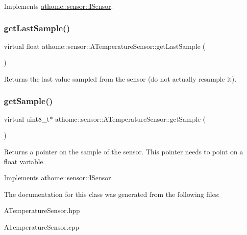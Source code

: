 Implements \mbox{\hyperlink{classathome_1_1sensor_1_1_i_sensor_a95785b54ffe3a8f7e48c81b5732e3b9f}{athome\+::sensor\+::\+I\+Sensor}}.

\mbox{\label{classathome_1_1sensor_1_1_a_temperature_sensor_a2f1833f5fac81baed80f75583a86491d}} 
\subsubsection{\texorpdfstring{get\+Last\+Sample()}{getLastSample()}}
{\footnotesize\ttfamily virtual float athome\+::sensor\+::\+A\+Temperature\+Sensor\+::get\+Last\+Sample (\begin{DoxyParamCaption}{ }\end{DoxyParamCaption})\hspace{0.3cm}{\ttfamily [pure virtual]}}

Returns the last value sampled from the sensor (do not actually resample it). \mbox{\label{classathome_1_1sensor_1_1_a_temperature_sensor_a397794217f3163950add6d28f69a6202}} 
\subsubsection{\texorpdfstring{get\+Sample()}{getSample()}}
{\footnotesize\ttfamily virtual uint8\+\_\+t$\ast$ athome\+::sensor\+::\+A\+Temperature\+Sensor\+::get\+Sample (\begin{DoxyParamCaption}{ }\end{DoxyParamCaption})\hspace{0.3cm}{\ttfamily [pure virtual]}}

Returns a pointer on the sample of the sensor. This pointer needs to point on a float variable. 

Implements \mbox{\hyperlink{classathome_1_1sensor_1_1_i_sensor_a2513fd8acc5d8251439330ca0e78cf04}{athome\+::sensor\+::\+I\+Sensor}}.



The documentation for this class was generated from the following files\+:\begin{DoxyCompactItemize}
\item 
A\+Temperature\+Sensor.\+hpp\item 
A\+Temperature\+Sensor.\+cpp\end{DoxyCompactItemize}
